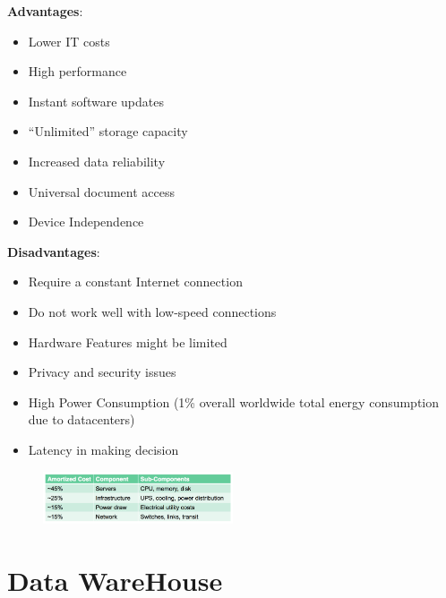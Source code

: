 \documentclass[10pt, oneside]{article}
\begin{document}
\begin{multicols}{2}
\noindent
{\bf Advantages}:
\begin{itemize}
    \item Lower IT costs
    \item High performance
    \item Instant software updates
    \item “Unlimited” storage capacity
    \item Increased data reliability
    \item Universal document access
    \item Device Independence 
\end{itemize}

\columnbreak
\noindent
{\bf Disadvantages}:
\begin{itemize}
    \item Require a constant Internet connection
    \item Do not work well with low-speed connections
    \item Hardware Features might be limited
    \item Privacy and security issues
    \item High Power Consumption (1\% overall worldwide total energy consumption due to datacenters)
    \item Latency in making decision
\end{itemize}

\end{multicols}


\begin{figure}[H]
    \begin{center}
    \includegraphics[width=0.5\textwidth]{img/img2.png}
    \label{fig:consumptions}
    \end{center}
\end{figure}

\newpage

\section{Data WareHouse}
\end{document}
